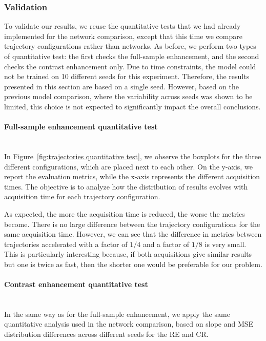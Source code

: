 \documentclass[12pt]{article}
\begin{document}
\subsubsection{Validation} 

To validate our results, we reuse the quantitative tests that we had already implemented for the network comparison, except that this time we compare trajectory configurations rather than networks.
As before, we perform two types of quantitative test: the first checks the full-sample enhancement, and the second checks the contrast enhancement only.
Due to time constraints, the model could not be trained on 10 different seeds for this experiment. 
Therefore, the results presented in this section are based on a single seed. 
However, based on the previous model comparison, where the variability across seeds was shown to be limited, this choice is not expected to significantly impact the overall conclusions.

\paragraph{Full-sample enhancement quantitative test}
\mbox{}\\

In Figure~\ref{fig:trajectories quantitative test}, we observe the boxplots for the three different configurations, which are placed next to each other.
On the y-axis, we report the evaluation metrics, while the x-axis represents the different acquisition times.
The objective is to analyze how the distribution of results evolves with acquisition time for each trajectory configuration.

As expected, the more the acquisition time is reduced, the worse the metrics become.
There is no large difference between the trajectory configurations for the same acquisition time.
However, we can see that the difference in metrics between trajectories accelerated with a factor of $1/4$ and a factor of $1/8$ is very small.
This is particularly interesting because, if both acquisitions give similar results but one is twice as fast, then the shorter one would be preferable for our problem.

\paragraph{Contrast enhancement quantitative test}
\mbox{}\\

In the same way as for the full-sample enhancement, we apply the same quantitative analysis used in the network comparison, based on slope and MSE distribution differences across different seeds for the RE and CR.
\vspace{0.5cm}
\end{document}
